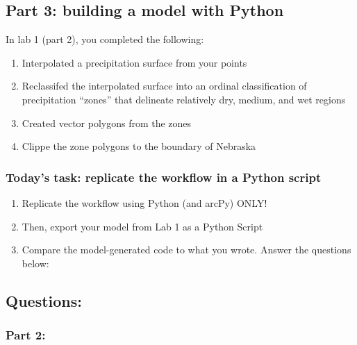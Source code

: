 \documentclass[]{article}
\providecommand{\tightlist}{%
  \setlength{\itemsep}{0pt}\setlength{\parskip}{0pt}}
\begin{document}
\newpage

\hypertarget{part-3-building-a-model-with-python}{%
\subsection{Part 3: building a model with
Python}\label{part-3-building-a-model-with-python}}

In lab 1 (part 2), you completed the following:

\begin{enumerate}
\def\labelenumi{\arabic{enumi}.}
\tightlist
\item
  Interpolated a precipitation surface from your points
\item
  Reclassifed the interpolated surface into an ordinal classification of
  precipitation ``zones'' that delineate relatively dry, medium, and wet
  regions
\item
  Created vector polygons from the zones
\item
  Clippe the zone polygons to the boundary of Nebraska
\end{enumerate}

\hypertarget{todays-task-replicate-the-workflow-in-a-python-script}{%
\subsubsection{Today's task: replicate the workflow in a Python
script}\label{todays-task-replicate-the-workflow-in-a-python-script}}

\begin{enumerate}
\def\labelenumi{\arabic{enumi}.}
\tightlist
\item
  Replicate the workflow using Python (and arcPy) ONLY!
\item
  Then, export your model from Lab 1 as a Python Script
\item
  Compare the model-generated code to what you wrote. Answer the
  questions below:
\end{enumerate}

\newpage

\hypertarget{questions}{%
\subsection{Questions:}\label{questions}}

\hypertarget{part-2}{%
\subsubsection{Part 2:}\label{part-2}}
\end{document}
